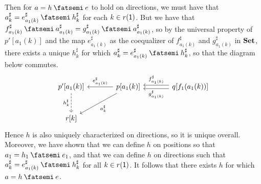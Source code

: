 \documentclass[Book-Poly]{subfiles}
\begin{document}
\begin{exercise}
\begin{solution}
\begin{enumerate}
    Then for $a = h \then e$ to hold on directions, we must have that $a^\sharp_k = e^\sharp_{a_1(k)} \then h^\sharp_k$ for each $k \in r(\textsf{1})$.
    But we have that $f^\sharp_{a_1(k)} \then a^\sharp_{a_1(k)} = g^\sharp_{a_1(k)} \then a^\sharp_{a_1(k)}$, so by the universal property of $p'[a_1(k)]$ and the map $e^\sharp_{a_1(k)}$ as the coequalizer of $f^\sharp_{a_1(k)}$ and $g^\sharp_{a_1(k)}$ in $\mathbf{Set}$, there exists a unique $h^\sharp_k$ for which $a^\sharp_k = e^\sharp_{a_1(k)} \then h^\sharp_k$, so that the diagram below commutes.
    \begin{equation*} %
    \begin{tikzcd}[sep=large]
        p'[a_1(k)] \ar[d, "h^\sharp_k"', dashed] & p[a_1(k)] \ar[l, "e^\sharp_{a_1(k)}"'] \ar[dl, "a^\sharp_k"] & q[f_1(a_1(k))] \ar[l, "f^\sharp_{a_1(k)}"', shift right] \ar[l, "g^\sharp_{a_1(k)}", shift left] \\
        r[k]
    \end{tikzcd}
    \end{equation*}
    Hence $h$ is also uniquely characterized on directions, so it is unique overall.
    Moreover, we have shown that we can define $h$ on positions so that $a_1 = h_1 \then e_1$, and that we can define $h$ on directions such that $a^\sharp_k = e^\sharp_{a_1(k)} \then h^\sharp_k$ for all $k \in r(\textsf{1})$.
    It follows that there exists $h$ for which $a = h \then e$.
\end{enumerate}
\end{solution}
\end{exercise}

\end{document}
